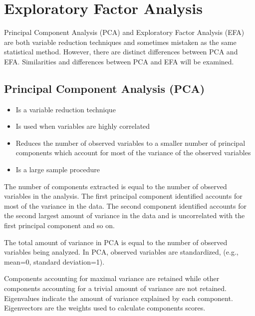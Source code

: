 
	
	\tableofcontents

\section{Exploratory Factor Analysis}
Principal Component Analysis (PCA) and Exploratory Factor Analysis (EFA) are both variable reduction techniques
and sometimes mistaken as the same statistical method. However, there are distinct differences between PCA and
EFA. Similarities and differences between PCA and EFA will be examined.


\subsection{Principal Component Analysis (PCA)}
\begin{itemize}
\item Is a variable reduction technique
\item Is used when variables are highly correlated
\item Reduces the number of observed variables to a smaller number of principal components which account for most
of the variance of the observed variables
\item Is a large sample procedure
\end{itemize}

The number of components extracted is equal to the number of observed variables in the analysis. The first principal
component identified accounts for most of the variance in the data. The second component identified accounts for the
second largest amount of variance in the data and is uncorrelated with the first principal component and so on.


The total amount of variance in PCA is equal to the number of observed variables being analyzed. In PCA, observed
variables are standardized, (e.g., mean=0, standard deviation=1).

Components accounting for maximal variance are retained while other components accounting for a trivial amount of
variance are not retained. Eigenvalues indicate the amount of variance explained by each component. Eigenvectors
are the weights used to calculate components scores.


